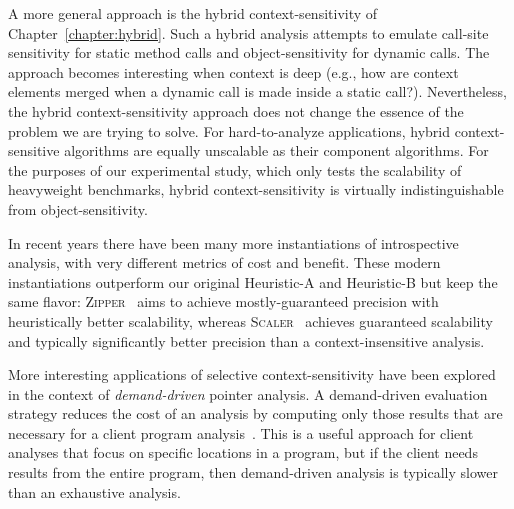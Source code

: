 A more general approach is the hybrid context-sensitivity of Chapter~\ref{chapter:hybrid}. Such a hybrid analysis attempts to emulate call-site sensitivity for static method calls and object-sensitivity for dynamic calls. The approach becomes interesting when context is deep (e.g., how are context elements merged when a dynamic call is made inside a static call?). Nevertheless, the hybrid context-sensitivity approach does not change the essence of the problem we are trying to solve. For hard-to-analyze applications, hybrid context-sensitive algorithms are equally unscalable as their component algorithms. For the purposes of our experimental study, which only tests the scalability of heavyweight benchmarks, hybrid context-sensitivity is virtually indistinguishable from object-sensitivity.

In recent years there have been many more instantiations of introspective analysis, with very different metrics of cost and benefit. These modern instantiations outperform our original Heuristic-A and Heuristic-B but keep the same flavor: \textsc{Zipper}~\cite{oopsla:2018:Li} aims to achieve mostly-guaranteed precision with heuristically better scalability, whereas \textsc{Scaler}~\cite{esec-fse:2018:Li} achieves guaranteed scalability and typically significantly better precision than a context-insensitive analysis.

More interesting applications of selective context-sensitivity have been explored in the context of \emph{demand-driven} pointer analysis. A demand-driven evaluation strategy reduces the cost of an analysis by computing only those results that are necessary for a client program analysis~\cite{oopsla:2005:Sridharan,pldi:2006:Sridharan,popl:2008:Zheng,pldi:2001:Heintze}. This is a useful approach for client analyses that focus on specific locations in a program, but if the client needs results from the entire program, then demand-driven analysis is typically slower than an exhaustive analysis.

